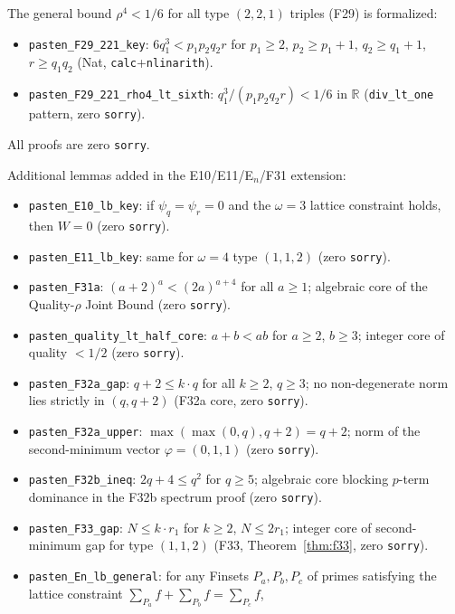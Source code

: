 \documentclass[12pt]{article}
\theoremstyle{definition}
\begin{document}
The general bound $\rho^4 < 1/6$ for all type $(2,2,1)$ triples (F29) is formalized:
\begin{itemize}
  \item \texttt{pasten\_F29\_221\_key}: $6q_1^3 < p_1 p_2 q_2 r$ for $p_1 \ge 2$,
    $p_2 \ge p_1{+}1$, $q_2 \ge q_1{+}1$, $r \ge q_1 q_2$ (Nat, \texttt{calc}+\texttt{nlinarith}).
  \item \texttt{pasten\_F29\_221\_rho4\_lt\_sixth}:
    $q_1^3/(p_1 p_2 q_2 r) < 1/6$ in $\mathbb{R}$
    (\texttt{div\_lt\_one} pattern, zero \texttt{sorry}).
\end{itemize}

All proofs are zero \texttt{sorry}.

Additional lemmas added in the E10/E11/E$_n$/F31 extension:
\begin{itemize}
  \item \texttt{pasten\_E10\_lb\_key}: if $\psi_q = \psi_r = 0$ and the $\omega=3$
    lattice constraint holds, then $W = 0$ (zero \texttt{sorry}).
  \item \texttt{pasten\_E11\_lb\_key}: same for $\omega=4$ type $(1,1,2)$
    (zero \texttt{sorry}).
  \item \texttt{pasten\_F31a}: $(a+2)^a < (2a)^{a+4}$ for all $a \ge 1$;
    algebraic core of the Quality-$\rho$ Joint Bound (zero \texttt{sorry}).
  \item \texttt{pasten\_quality\_lt\_half\_core}: $a+b < ab$ for $a \ge 2$, $b \ge 3$;
    integer core of quality $< 1/2$ (zero \texttt{sorry}).
  \item \texttt{pasten\_F32a\_gap}: $q+2 \le k\cdot q$ for all $k \ge 2$, $q \ge 3$;
    no non-degenerate norm lies strictly in $(q, q+2)$ (F32a core, zero \texttt{sorry}).
  \item \texttt{pasten\_F32a\_upper}: $\max(\max(0,q),q+2) = q+2$; norm of the
    second-minimum vector $\varphi=(0,1,1)$ (zero \texttt{sorry}).
  \item \texttt{pasten\_F32b\_ineq}: $2q+4 \le q^2$ for $q \ge 5$;
    algebraic core blocking $p$-term dominance in the F32b spectrum proof
    (zero \texttt{sorry}).
  \item \texttt{pasten\_F33\_gap}: $N \le k\cdot r_1$ for $k \ge 2$, $N \le 2r_1$;
    integer core of second-minimum gap for type $(1,1,2)$ (F33, Theorem~\ref{thm:f33},
    zero \texttt{sorry}).
  \item \texttt{pasten\_En\_lb\_general}: for any Finsets $P_a, P_b, P_c$ of primes
    satisfying the lattice constraint $\sum_{P_a} f + \sum_{P_b} f = \sum_{P_c} f$,

\end{itemize}
\end{document}
